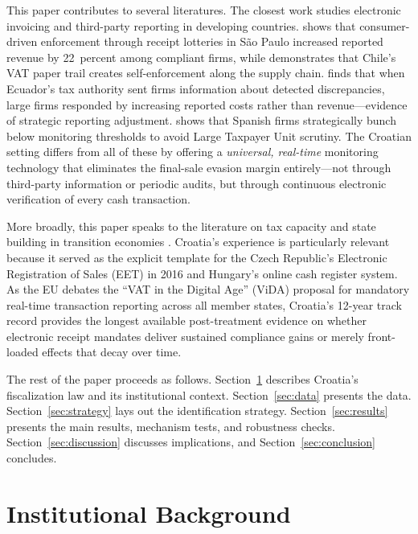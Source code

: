 \documentclass[12pt]{article}
\begin{document}
This paper contributes to several literatures. The closest work studies electronic invoicing and third-party reporting in developing countries. \citet{naritomi2019} shows that consumer-driven enforcement through receipt lotteries in S\~{a}o Paulo increased reported revenue by 22~percent among compliant firms, while \citet{pomeranz2015} demonstrates that Chile's VAT paper trail creates self-enforcement along the supply chain. \citet{carrillo2017} finds that when Ecuador's tax authority sent firms information about detected discrepancies, large firms responded by increasing reported costs rather than revenue---evidence of strategic reporting adjustment. \citet{almunia2018} shows that Spanish firms strategically bunch below monitoring thresholds to avoid Large Taxpayer Unit scrutiny. The Croatian setting differs from all of these by offering a \emph{universal, real-time} monitoring technology that eliminates the final-sale evasion margin entirely---not through third-party information or periodic audits, but through continuous electronic verification of every cash transaction.

More broadly, this paper speaks to the literature on tax capacity and state building in transition economies \citep{besley2014, gordon2009}. Croatia's experience is particularly relevant because it served as the explicit template for the Czech Republic's Electronic Registration of Sales (EET) in 2016 and Hungary's online cash register system. As the EU debates the ``VAT in the Digital Age'' (ViDA) proposal for mandatory real-time transaction reporting across all member states, Croatia's 12-year track record provides the longest available post-treatment evidence on whether electronic receipt mandates deliver sustained compliance gains or merely front-loaded effects that decay over time.

The rest of the paper proceeds as follows. Section~\ref{sec:background} describes Croatia's fiscalization law and its institutional context. Section~\ref{sec:data} presents the data. Section~\ref{sec:strategy} lays out the identification strategy. Section~\ref{sec:results} presents the main results, mechanism tests, and robustness checks. Section~\ref{sec:discussion} discusses implications, and Section~\ref{sec:conclusion} concludes.


\section{Institutional Background}
\label{sec:background}
\end{document}
